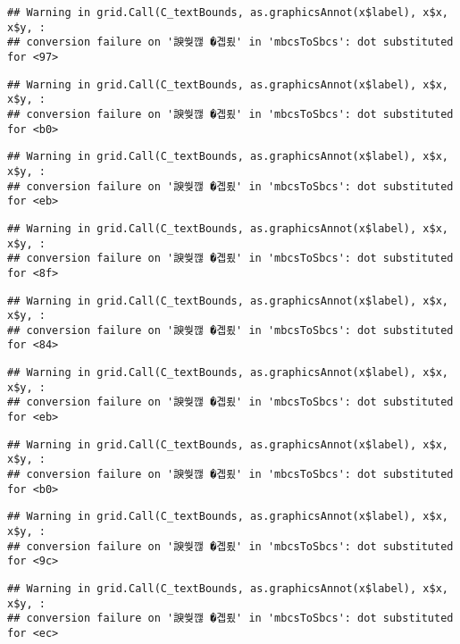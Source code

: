 \documentclass[
]{article}
\begin{document}
\begin{verbatim}
## Warning in grid.Call(C_textBounds, as.graphicsAnnot(x$label), x$x, x$y, :
## conversion failure on '諛쒖깮 �곕룄' in 'mbcsToSbcs': dot substituted for <97>
\end{verbatim}

\begin{verbatim}
## Warning in grid.Call(C_textBounds, as.graphicsAnnot(x$label), x$x, x$y, :
## conversion failure on '諛쒖깮 �곕룄' in 'mbcsToSbcs': dot substituted for <b0>
\end{verbatim}

\begin{verbatim}
## Warning in grid.Call(C_textBounds, as.graphicsAnnot(x$label), x$x, x$y, :
## conversion failure on '諛쒖깮 �곕룄' in 'mbcsToSbcs': dot substituted for <eb>
\end{verbatim}

\begin{verbatim}
## Warning in grid.Call(C_textBounds, as.graphicsAnnot(x$label), x$x, x$y, :
## conversion failure on '諛쒖깮 �곕룄' in 'mbcsToSbcs': dot substituted for <8f>
\end{verbatim}

\begin{verbatim}
## Warning in grid.Call(C_textBounds, as.graphicsAnnot(x$label), x$x, x$y, :
## conversion failure on '諛쒖깮 �곕룄' in 'mbcsToSbcs': dot substituted for <84>
\end{verbatim}

\begin{verbatim}
## Warning in grid.Call(C_textBounds, as.graphicsAnnot(x$label), x$x, x$y, :
## conversion failure on '諛쒖깮 �곕룄' in 'mbcsToSbcs': dot substituted for <eb>
\end{verbatim}

\begin{verbatim}
## Warning in grid.Call(C_textBounds, as.graphicsAnnot(x$label), x$x, x$y, :
## conversion failure on '諛쒖깮 �곕룄' in 'mbcsToSbcs': dot substituted for <b0>
\end{verbatim}

\begin{verbatim}
## Warning in grid.Call(C_textBounds, as.graphicsAnnot(x$label), x$x, x$y, :
## conversion failure on '諛쒖깮 �곕룄' in 'mbcsToSbcs': dot substituted for <9c>
\end{verbatim}

\begin{verbatim}
## Warning in grid.Call(C_textBounds, as.graphicsAnnot(x$label), x$x, x$y, :
## conversion failure on '諛쒖깮 �곕룄' in 'mbcsToSbcs': dot substituted for <ec>
\end{verbatim}
\end{document}
